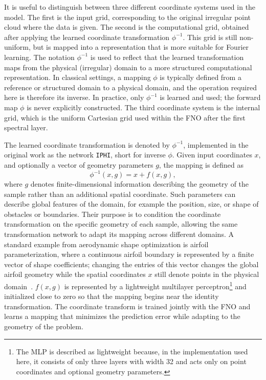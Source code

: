 It is useful to distinguish between three different coordinate systems used in the model. The first is the input grid, corresponding to the original irregular point cloud where the data is given. The second is the computational grid, obtained after applying the learned coordinate transformation $\phi^{-1}$. This grid is still non-uniform, but is mapped into a representation that is more suitable for Fourier learning. The notation $\phi^{-1}$ is used to reflect that the learned transformation maps from the physical (irregular) domain to a more structured computational representation. In classical settings, a mapping $\phi$ is typically defined from a reference or structured domain to a physical domain, and the operation required here is therefore its inverse. In practice, only $\phi^{-1}$ is learned and used; the forward map $\phi$ is never explicitly constructed. The third coordinate system is the internal grid, which is the uniform Cartesian grid used within the FNO after the first spectral layer.

The learned coordinate transformation is denoted by $\phi^{-1}$, implemented in the original work as the network \texttt{IPHI}, short for inverse \(\phi\). Given input coordinates \(x\), and optionally a vector of geometry parameters \(g\), the mapping is defined as
\begin{equation}
\phi^{-1}(x, g) = x + f(x, g),
\end{equation}
where \(g\) denotes finite-dimensional information describing the geometry of the sample rather than an additional spatial coordinate. Such parameters can describe global features of the domain, for example the position, size, or shape of obstacles or boundaries. Their purpose is to condition the coordinate transformation on the specific geometry of each sample, allowing the same transformation network to adapt its mapping across different domains. A standard example from aerodynamic shape optimization is airfoil parameterization, where a continuous airfoil boundary is represented by a finite vector of shape coefficients; changing the entries of this vector changes the global airfoil geometry while the spatial coordinates \(x\) still denote points in the physical domain~\cite{airfoils}. \(f(x,g)\) is represented by a lightweight multilayer perceptron\footnote{The MLP is described as lightweight because, in the implementation used here, it consists of only three layers with width 32 and acts only on point coordinates and optional geometry parameters.} and initialized close to zero so that the mapping begins near the identity transformation. The coordinate transform is trained jointly with the FNO and learns a mapping that minimizes the prediction error while adapting to the geometry of the problem.


